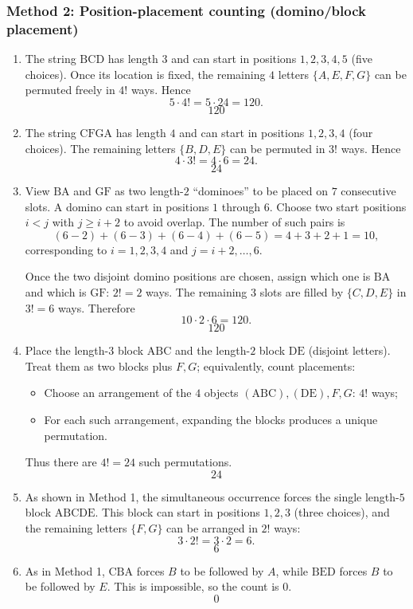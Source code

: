 \documentclass[12pt]{article}
\begin{document}
\subsubsection{Method 2: Position-placement counting (domino/block placement)}
\begin{enumerate}[label=(\alph*)]
\item The string $\text{BCD}$ has length $3$ and can start in positions $1,2,3,4,5$ (five choices). Once its location is fixed, the remaining $4$ letters $\{A,E,F,G\}$ can be permuted freely in $4!$ ways. Hence
\[
5\cdot 4! = 5\cdot 24 = 120.
\]
\[
\boxed{120}
\]

\item The string $\text{CFGA}$ has length $4$ and can start in positions $1,2,3,4$ (four choices). The remaining letters $\{B,D,E\}$ can be permuted in $3!$ ways. Hence
\[
4\cdot 3! = 4\cdot 6 = 24.
\]
\[
\boxed{24}
\]

\item View $\text{BA}$ and $\text{GF}$ as two length-$2$ ``dominoes'' to be placed on $7$ consecutive slots. A domino can start in positions $1$ through $6$. Choose two start positions $i<j$ with $j\ge i+2$ to avoid overlap. The number of such pairs is
\[
(6-2) + (6-3) + (6-4) + (6-5) = 4+3+2+1 = 10,
\]
corresponding to $i=1,2,3,4$ and $j=i+2,\dots,6$.

Once the two disjoint domino positions are chosen, assign which one is $\text{BA}$ and which is $\text{GF}$: $2! = 2$ ways. The remaining $3$ slots are filled by $\{C,D,E\}$ in $3! = 6$ ways. Therefore
\[
10\cdot 2 \cdot 6 = 120.
\]
\[
\boxed{120}
\]

\item Place the length-$3$ block $\text{ABC}$ and the length-$2$ block $\text{DE}$ (disjoint letters). Treat them as two blocks plus $F,G$; equivalently, count placements:
\begin{itemize}[leftmargin=*]
\item Choose an arrangement of the $4$ objects $(\text{ABC}),(\text{DE}),F,G$: $4!$ ways;
\item For each such arrangement, expanding the blocks produces a unique permutation.
\end{itemize}
Thus there are $4! = 24$ such permutations.
\[
\boxed{24}
\]

\item As shown in Method 1, the simultaneous occurrence forces the single length-$5$ block $\text{ABCDE}$. This block can start in positions $1,2,3$ (three choices), and the remaining letters $\{F,G\}$ can be arranged in $2!$ ways:
\[
3\cdot 2! = 3\cdot 2 = 6.
\]
\[
\boxed{6}
\]

\item As in Method 1, $\text{CBA}$ forces $B$ to be followed by $A$, while $\text{BED}$ forces $B$ to be followed by $E$. This is impossible, so the count is $0$.
\[
\boxed{0}
\]
\end{enumerate}
\end{document}
